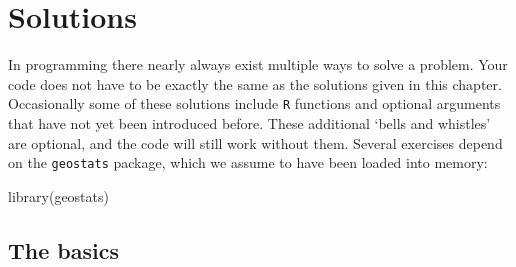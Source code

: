 \chapter{Solutions}
\label{ch:solutions}

In programming there nearly always exist multiple ways to solve a
problem. Your code does not have to be exactly the same as the
solutions given in this chapter. Occasionally some of these solutions
include \texttt{R} functions and optional arguments that have not yet
been introduced before. These additional `bells and whistles' are
optional, and the code will still work without them. Several exercises
depend on the \texttt{geostats} package, which we assume to have been
loaded into memory:

\begin{console}
library(geostats)
\end{console}
  
\section{The basics}
\label{sec:sol-basics}

